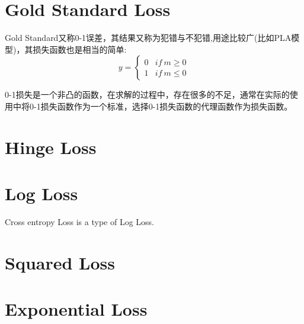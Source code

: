 \documentclass[hyperref, UTF-8]{ctexart}
\begin{document}
\section{Gold Standard Loss}
Gold Standard又称0-1误差，其结果又称为犯错与不犯错,用途比较广(比如PLA模型)，其损失函数也是相当的简单:
\begin{displaymath}
  y = \left \{
      \begin{array}{ll}
        0 & if ~ m \geqslant 0  \\
        1 &  if ~ m \leqslant 0 
      \end{array}  \right.
\end{displaymath}

0-1损失是一个非凸的函数，在求解的过程中，存在很多的不足，通常在实际的使用中将0-1损失函数作为一个标准，选择0-1损失函数的代理函数作为损失函数。

\section{Hinge Loss}

\section{Log Loss}
Cross entropy Loss is a type of Log Loss.

\section{Squared Loss}

\section{Exponential Loss}
\end{document}
